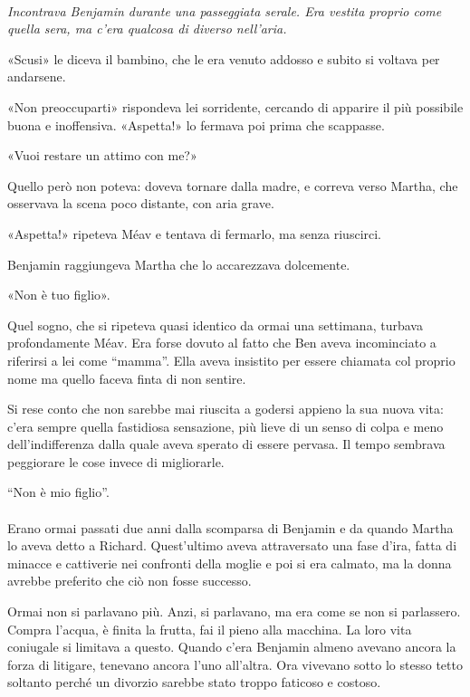 \documentclass[a4paper,12pt]{book}
\begin{document}
\paragraph{}
{\itshape
Incontrava Benjamin durante una passeggiata serale. Era vestita proprio come
quella sera, ma c'era qualcosa di diverso nell'aria.

«Scusi» le diceva il bambino, che le era venuto addosso e subito si voltava
per andarsene.

«Non preoccuparti» rispondeva lei sorridente, cercando di apparire il più
possibile buona e inoffensiva. «Aspetta!» lo fermava poi prima che scappasse.

«Vuoi restare un attimo con me?»

Quello però non poteva: doveva tornare dalla madre, e correva verso Martha, che
osservava la scena poco distante, con aria grave.

«Aspetta!» ripeteva Méav e tentava di fermarlo, ma senza riuscirci.

Benjamin raggiungeva Martha che lo accarezzava dolcemente.

«Non è tuo figlio».
\/}

Quel sogno, che si ripeteva quasi identico da ormai una settimana, turbava
profondamente Méav. Era forse dovuto al fatto che Ben aveva incominciato a
riferirsi a lei come ``mamma''. Ella aveva insistito per essere chiamata col
proprio nome ma quello faceva finta di non sentire.

Si rese conto che non sarebbe mai riuscita a godersi appieno la sua nuova vita:
c'era sempre quella fastidiosa sensazione, più lieve di un senso di colpa e
meno dell'indifferenza dalla quale aveva sperato di essere pervasa. Il tempo
sembrava peggiorare le cose invece di migliorarle.

``Non è mio figlio''.

\paragraph{}
Erano ormai passati due anni dalla scomparsa di Benjamin e da quando Martha lo
aveva detto a Richard. Quest'ultimo aveva attraversato una fase d'ira, fatta di
minacce e cattiverie nei confronti della moglie e poi si era calmato, ma la
donna avrebbe preferito che ciò non fosse successo.

Ormai non si parlavano più. Anzi, si parlavano, ma era come se non si
parlassero. Compra l'acqua, è finita la frutta, fai il pieno alla macchina. La
loro vita coniugale si limitava a questo. Quando c'era Benjamin almeno avevano
ancora la forza di litigare, tenevano ancora l'uno all'altra. Ora vivevano sotto
lo stesso tetto soltanto perché un divorzio sarebbe stato troppo faticoso e
costoso.
\end{document}
